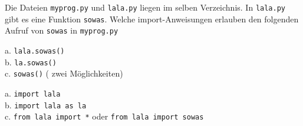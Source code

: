 \question[3]  Die Dateien \texttt{myprog.py} und \texttt{lala.py}
liegen im selben Verzeichnis. In \texttt{lala.py} gibt es eine Funktion \texttt{sowas}.
Welche import-Anweisungen erlauben den folgenden Aufruf von \texttt{sowas} in \texttt{myprog.py}

a. \texttt{lala.sowas()} \\
b. \texttt{la.sowas()}  \\
c. \texttt{sowas()}    ( zwei Möglichkeiten)
\begin{solutionbox}{5cm}

a. \texttt{import lala} \\
b. \texttt{import lala as la}  \\
c.  \texttt{from lala import *}   oder  \texttt{from lala import sowas}
\end{solutionbox}
